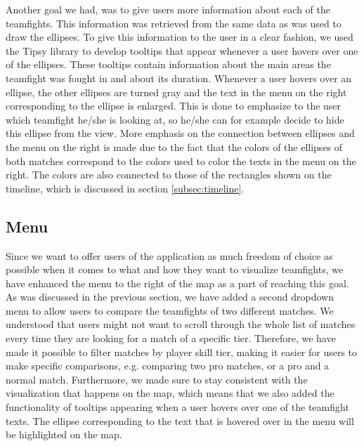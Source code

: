 \documentclass[11pt,twoside,a4paper]{article}
\begin{document}
Another goal we had, was to give users more information about each of the teamfights. This information was retrieved from the same data as was used to draw the ellipses. To give this information to the user in a clear fashion, we used the Tipsy library %
to develop tooltips that appear whenever a user hovers over one of the ellipses. These tooltips contain information about the main areas the teamfight was fought in and about its duration. Whenever a user hovers over an ellipse, the other ellipses are turned gray and the text in the menu on the right corresponding to the ellipse is enlarged. This is done to emphasize to the user which teamfight he/she is looking at, so he/she can for example decide to hide this ellipse from the view.\newline\newline
More emphasis on the connection between ellipses and the menu on the right is made due to the fact that the colors of the ellipses of both matches correspond to the colors used to color the texts in the menu on the right. The colors are also connected to those of the rectangles shown on the timeline, which is discussed in section \ref{subsec:timeline}.
\newpage
\subsection{Menu}
\label{subsec:menu}
Since we want to offer users of the application as much freedom of choice as possible when it comes to what and how they want to visualize teamfights, we have enhanced the menu to the right of the map as a part of reaching this goal. As was discussed in the previous section, we have added a second dropdown menu to allow users to compare the teamfights of two different matches. We understood that users might not want to scroll through the whole list of matches every time they are looking for a match of a specific tier. Therefore, we have made it possible to filter matches by player skill tier, making it easier for users to make specific comparisons, e.g. comparing two pro matches, or a pro and a normal match.
\newline\newline
Furthermore, we made sure to stay consistent with the visualization that happens on the map, which means that we also added the functionality of tooltips appearing when a user hovers over one of the teamfight texts. The ellipse corresponding to the text that is hovered over in the menu will be highlighted on the map.
\end{document}
